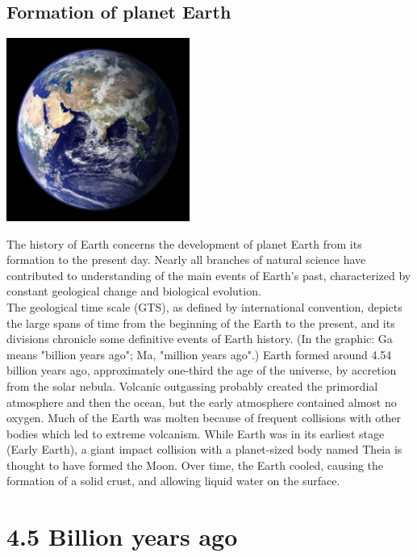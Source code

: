 \documentclass[11pt]{report}
\begin{document}
\section{Formation of planet Earth}
\vspace{2mm}\begin{center}\includegraphics[width=6cm]{./img/earth.jpg}\end{center}
The history of Earth concerns the development of planet Earth from its formation to the present day. Nearly all branches of natural science have contributed to understanding of the main events of Earth's past, characterized by constant geological change and biological evolution.\\
The geological time scale (GTS), as defined by international convention, depicts the large spans of time from the beginning of the Earth to the present, and its divisions chronicle some definitive events of Earth history. (In the graphic: Ga means "billion years ago"; Ma, "million years ago".) Earth formed around 4.54 billion years ago, approximately one-third the age of the universe, by accretion from the solar nebula. Volcanic outgassing probably created the primordial atmosphere and then the ocean, but the early atmosphere contained almost no oxygen. Much of the Earth was molten because of frequent collisions with other bodies which led to extreme volcanism. While Earth was in its earliest stage (Early Earth), a giant impact collision with a planet-sized body named Theia is thought to have formed the Moon. Over time, the Earth cooled, causing the formation of a solid crust, and allowing liquid water on the surface.

\chapter{4.5 Billion years ago}
\end{document}
